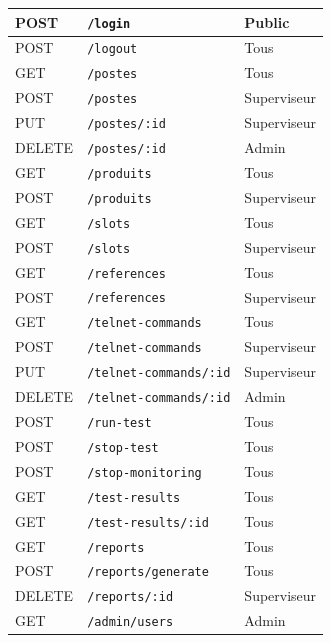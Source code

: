 \begin{longtable}{|L{2cm}|L{8cm}|L{3.5cm}|}
  POST   & \texttt{/login}                  & Public      \\ \hline
  POST   & \texttt{/logout}                 & Tous        \\ \hline
  GET    & \texttt{/postes}                 & Tous        \\ \hline
  POST   & \texttt{/postes}                 & Superviseur \\ \hline
  PUT    & \texttt{/postes/:id}             & Superviseur \\ \hline
  DELETE & \texttt{/postes/:id}             & Admin       \\ \hline
  GET    & \texttt{/produits}               & Tous        \\ \hline
  POST   & \texttt{/produits}               & Superviseur \\ \hline
  GET    & \texttt{/slots}                  & Tous        \\ \hline
  POST   & \texttt{/slots}                  & Superviseur \\ \hline
  GET    & \texttt{/references}             & Tous        \\ \hline
  POST   & \texttt{/references}             & Superviseur \\ \hline
  GET    & \texttt{/telnet-commands}        & Tous        \\ \hline
  POST   & \texttt{/telnet-commands}        & Superviseur \\ \hline
  PUT    & \texttt{/telnet-commands/:id}    & Superviseur \\ \hline
  DELETE & \texttt{/telnet-commands/:id}    & Admin       \\ \hline
  POST   & \texttt{/run-test}               & Tous        \\ \hline
  POST   & \texttt{/stop-test}              & Tous        \\ \hline
  POST   & \texttt{/stop-monitoring}        & Tous        \\ \hline
  GET    & \texttt{/test-results}           & Tous        \\ \hline
  GET    & \texttt{/test-results/:id}       & Tous        \\ \hline
  GET    & \texttt{/reports}                & Tous        \\ \hline
  POST   & \texttt{/reports/generate}       & Tous        \\ \hline
  DELETE & \texttt{/reports/:id}            & Superviseur \\ \hline
  GET    & \texttt{/admin/users}            & Admin       \\ \hline

\end{longtable}
